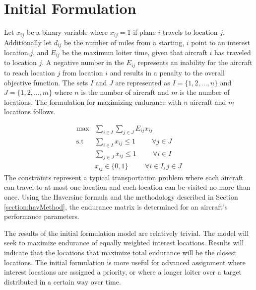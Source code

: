 \section{Initial Formulation}
Let $x_{ij}$ be a binary variable where $x_{ij} = 1$ if plane $i$ travels to location $j$. Additionally let $d_{ij}$ be the number of miles from a starting, $i$ point to an interest location,$j$, and $E_{ij}$ be the maximum loiter time, given that aircraft $i$ has traveled to location $j$. A negative number in the $E_{ij}$ represents an inability for the aircraft to reach location $j$ from location $i$ and results in a penalty to the overall objective function. The sets $I$ and $J$ are represented as $I = \{1,2,\dots,n\}$ and $J = \{1,2,\dots,m\}$ where $n$ is the number of aircraft and $m$ is the number of locations. The formulation for maximizing endurance with $n$ aircraft and $m$ locations follows.\par
\begin{equation}
    \begin{aligned}
        \max &\sum_{i\in I}\sum_{j\in J} E_{ij}x_{ij}\hspace{1cm}\\
        \text{s.t } &\sum_{i\in I} x_{ij}\leq 1\hspace{1cm} \forall j\in J\\
        &\sum_{j\in J}x_{ij} \leq 1\hspace{1cm} \forall i \in I\\
        &x_{ij}\in \{0,1\} \hspace{1cm} \forall i\in I, j\in J
    \end{aligned}
\end{equation}
The constraints represent a typical transportation problem where each aircraft can travel to at most one location and each location can be visited no more than once. Using the Haversine formula and the methodology described in Section \ref{section:havMethod}, the endurance matrix is determined for an aircraft's performance parameters. \par
The results of the initial formulation model are relatively trivial. The model will seek to maximize endurance of equally weighted interest locations. Results will indicate that the locations that maximize total endurance will be the closest locations. The initial formulation is more useful for advanced assignment where interest locations are assigned a priority, or where a longer loiter over a target distributed in a certain way over time.\par

